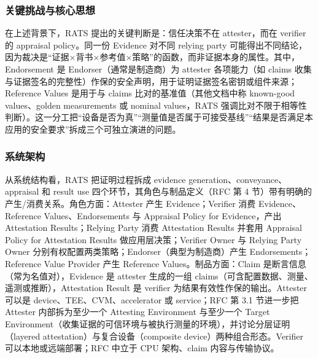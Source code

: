\documentclass[11pt]{ctexart}
\begin{document}
\subsubsection{关键挑战与核心思想}
在上述背景下，RATS 提出的关键判断是：信任决策不在 attester，而在 verifier 的 appraisal policy。同一份 Evidence 对不同 relying party 可能得出不同结论，因为裁决是“证据×背书×参考值×策略”的函数，而非证据本身的属性。其中，Endorsement 是 Endorser（通常是制造商）为 attester 各项能力（如 claims 收集与证据签名的完整性）作保的安全声明，用于证明证据签名密钥或组件来源；Reference Values 是用于与 claims 比对的基准值（其他文档中称 known-good values、golden measurements 或 nominal values，RATS 强调比对不限于相等性判断）。这一分工把“设备是否为真”“测量值是否属于可接受基线”“结果是否满足本应用的安全要求”拆成三个可独立演进的问题。\par
\subsubsection{系统架构}
从系统结构看，RATS 把证明过程拆成 evidence generation、conveyance、appraisal 和 result use 四个环节，其角色与制品定义（RFC 第 4 节）带有明确的产生/消费关系。角色方面：Attester 产生 Evidence；Verifier 消费 Evidence、Reference Values、Endorsements 与 Appraisal Policy for Evidence，产出 Attestation Results；Relying Party 消费 Attestation Results 并套用 Appraisal Policy for Attestation Results 做应用层决策；Verifier Owner 与 Relying Party Owner 分别有权配置两类策略；Endorser（典型为制造商）产生 Endorsements；Reference Value Provider 产生 Reference Values。制品方面：Claim 是断言信息（常为名值对），Evidence 是 attester 生成的一组 claims（可含配置数据、测量、遥测或推断），Attestation Result 是 verifier 为结果有效性作保的输出。Attester 可以是 device、TEE、CVM、accelerator 或 service；RFC 第 3.1 节进一步把 Attester 内部拆为至少一个 Attesting Environment 与至少一个 Target Environment（收集证据的可信环境与被执行测量的环境），并讨论分层证明（layered attestation）与复合设备（composite device）两种组合形态。Verifier 可以本地或远端部署；RFC 中立于 CPU 架构、claim 内容与传输协议。\par
\end{document}

